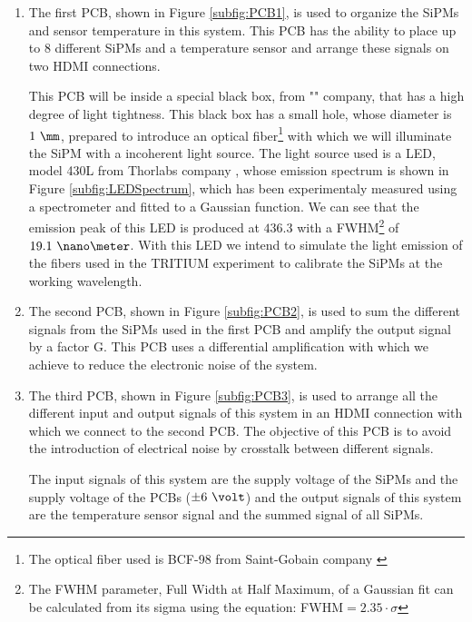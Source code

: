 \begin{enumerate}
\item{} The first PCB, shown in Figure \ref{subfig:PCB1}, is used to organize the SiPMs and sensor temperature in this system. This PCB has the ability to place up to 8 different SiPMs and a temperature sensor and arrange these signals on two HDMI connections.

This PCB will be inside a special black box, from "" company, that has a high degree of light tightness. This black box has a small hole, whose diameter is $1~\mm$, prepared to introduce an optical fiber\footnote{The optical fiber used is BCF-98 from Saint-Gobain company \cite{OpticalFibers}} with which we will illuminate the SiPM with a incoherent light source. The light source used is a LED, model 430L from Thorlabs company \cite{LEDThorlabs}, whose emission spectrum is shown in Figure \ref{subfig:LEDSpectrum}, which has been experimentaly measured using a spectrometer and fitted to a Gaussian function. We can see that the emission peak of this LED is produced at $436.3$ with a FWHM\footnote{The FWHM parameter, Full Width at Half Maximum, of a Gaussian fit can be calculated from its sigma using the equation: FWHM$=2.35 \cdot{} \sigma$} of $19.1~\nano\meter$. With this LED we intend to simulate the light emission of the fibers used in the TRITIUM experiment to calibrate the SiPMs at the working wavelength. 

\item{} The second PCB, shown in Figure \ref{subfig:PCB2}, is used to sum the different signals from the SiPMs used in the first PCB and amplify the output signal by a factor G. This PCB uses a differential amplification with which we achieve to reduce the electronic noise of the system.

\item{} The third PCB, shown in Figure \ref{subfig:PCB3}, is used to arrange all the different input and output signals of this system in an HDMI connection with which we connect to the second PCB. The objective of this PCB is to avoid the introduction of electrical noise by crosstalk between different signals.

The input signals of this system are the supply voltage of the SiPMs and the supply voltage of the PCBs ($\pm 6~\volt$) and the output signals of this system are the temperature sensor signal and the summed signal of all SiPMs. 

\end{enumerate}

